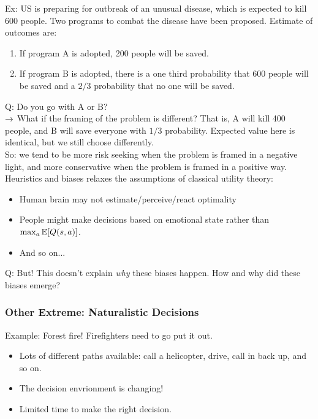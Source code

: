 Ex: US is preparing for outbreak of an unusual disease, which is expected to kill 600 people. Two programs to combat the disease have been proposed. Estimate of outcomes are:
\begin{enumerate}[A]
    \item If program A is adopted, 200 people will be saved.
    \item If program B is adopted, there is a one third probability that 600 people will be saved and a $2/3$ probability that no one will be saved.
\end{enumerate}
Q: Do you go with A or B? \\

$\rightarrow$ What if the framing of the problem is different? That is, A will kill 400 people, and B will save everyone with $1/3$ probability. Expected value here is identical, but we still choose differently. \\

So: we tend to be more risk seeking when the problem is framed in a negative light, and more conservative when the problem is framed in a positive way. \\

Heuristics and biases relaxes the assumptions of classical utility theory:
\begin{itemize}
    \item Human brain may not estimate/perceive/react optimality
    \item People might make decisions based on emotional state rather than $\max_a \mathbb{E}[Q(s,a)]$.
    \item And so on...
\end{itemize}

Q: But! This doesn't explain {\it why} these biases happen. How and why did these biases emerge?

\subsubsection{Other Extreme: Naturalistic Decisions~\cite{salas2001linking}}

Example: Forest fire! Firefighters need to go put it out.
\begin{itemize}
    \item Lots of different paths available: call a helicopter, drive, call in back up, and so on.
    \item The decision envrionment is changing!
    \item Limited time to make the right decision.
\end{itemize}

